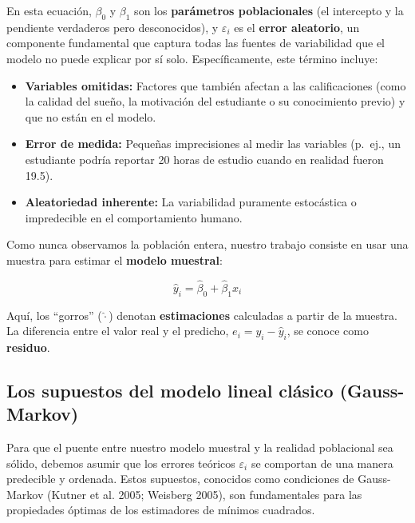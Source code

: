 \documentclass[
  letterpaper,
  DIV=11,
  numbers=noendperiod]{scrreprt}
\providecommand{\tightlist}{%
  \setlength{\itemsep}{0pt}\setlength{\parskip}{0pt}}
\begin{document}
En esta ecuación, \(\beta_0\) y \(\beta_1\) son los \textbf{parámetros
poblacionales} (el intercepto y la pendiente verdaderos pero
desconocidos), y \(\varepsilon_i\) es el \textbf{error aleatorio}, un
componente fundamental que captura todas las fuentes de variabilidad que
el modelo no puede explicar por sí solo. Específicamente, este término
incluye:

\begin{itemize}
\tightlist
\item
  \textbf{Variables omitidas:} Factores que también afectan a las
  calificaciones (como la calidad del sueño, la motivación del
  estudiante o su conocimiento previo) y que no están en el modelo.
\item
  \textbf{Error de medida:} Pequeñas imprecisiones al medir las
  variables (p.~ej., un estudiante podría reportar 20 horas de estudio
  cuando en realidad fueron 19.5).
\item
  \textbf{Aleatoriedad inherente:} La variabilidad puramente estocástica
  o impredecible en el comportamiento humano.
\end{itemize}

Como nunca observamos la población entera, nuestro trabajo consiste en
usar una muestra para estimar el \textbf{modelo muestral}:

\[
\hat{y}_i = \hat{\beta}_0 + \hat{\beta}_1 x_i
\]

Aquí, los ``gorros'' (\(\hat{\cdot}\)) denotan \textbf{estimaciones}
calculadas a partir de la muestra. La diferencia entre el valor real y
el predicho, \(e_i = y_i - \hat{y}_i\), se conoce como \textbf{residuo}.

\subsection{Los supuestos del modelo lineal clásico
(Gauss-Markov)}\label{los-supuestos-del-modelo-lineal-cluxe1sico-gauss-markov}

Para que el puente entre nuestro modelo muestral y la realidad
poblacional sea sólido, debemos asumir que los errores teóricos
\(\varepsilon_i\) se comportan de una manera predecible y ordenada.
Estos supuestos, conocidos como condiciones de Gauss-Markov (Kutner et
al. 2005; Weisberg 2005), son fundamentales para las propiedades óptimas
de los estimadores de mínimos cuadrados.
\end{document}
